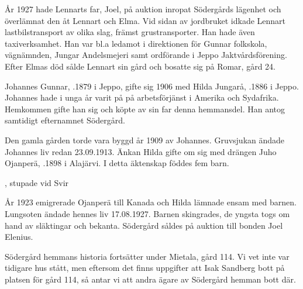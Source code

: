 År 1927 hade Lennarts far, Joel, på auktion inropat Södergårds lägenhet och överlämnat den åt Lennart och Elma. Vid sidan av jordbruket idkade Lennart lastbilstransport av olika slag, främst grustransporter. Han hade även taxiverksamhet. Han var bl.a ledamot i direktionen för Gunnar folkskola, vägnämnden, Jungar Andelsmejeri samt ordförande i Jeppo Jaktvårdsförening. Efter Elmas död sålde Lennart sin gård och bosatte sig på Romar, gård 24.


Johannes Gunnar, .1879 i Jeppo, gifte sig 1906 med Hilda Jungarå, .1886 i Jeppo. Johannes hade i unga år varit på på arbetsförjänst i Amerika och Sydafrika. Hemkommen gifte han sig och köpte av sin far denna hemmansdel. Han antog samtidigt efternamnet Södergård.
\begin{jhchildren}
  \item {}
  \item {}
  \item {}
  \item {}
\end{jhchildren}

Den gamla gården torde vara byggd år 1909 av Johannes. Gruvsjukan ändade Johannes liv redan 23.09.1913. Änkan Hilda gifte om sig med drängen Juho Ojanperä, .1898 i Alajärvi. I detta äktenskap föddes fem barn.
\begin{jhchildren}
  \item {}
  \item {}
  \item {}
  \item {}, stupade vid Svir
  \item {}
\end{jhchildren}

År 1923 emigrerade Ojanperä till Kanada och Hilda lämnade ensam med barnen. Lungsoten ändade hennes liv 17.08.1927. Barnen skingrades, de yngsta togs om hand av släktingar och bekanta. Södergård såldes på auktion till bonden Joel Elenius.

Södergård hemmans historia fortsätter under Mietala, gård 114. Vi vet inte var tidigare hus stått, men eftersom det finns uppgifter att Isak Sandberg bott på platsen för gård 114, så antar vi att andra ägare av Södergård hemman bott där.
